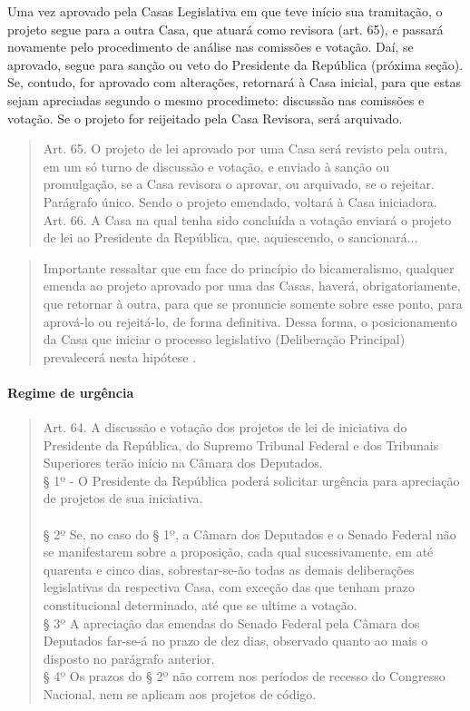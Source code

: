 \documentclass{article}
\begin{document}
Uma vez aprovado pela Casas Legislativa em que teve início sua tramitação, o projeto segue para a outra Casa, que atuará como revisora (art. 65), e passará novamente pelo procedimento de análise nas comissões e votação. Daí, se aprovado, segue para sanção ou veto do Presidente da República (próxima seção). Se, contudo, for aprovado com alterações, retornará à Casa inicial, para que estas sejam apreciadas segundo o mesmo procedimeto: discussão nas comissões e votação. Se o projeto for reijeitado pela Casa Revisora, será arquivado.

\begin{quote}
    Art. 65. O projeto de lei aprovado por uma Casa será revisto pela outra, em um só turno de discussão e votação, e enviado à sanção ou promulgação, se a Casa revisora o aprovar, ou arquivado, se o rejeitar.\\
    Parágrafo único. Sendo o projeto emendado, voltará à Casa iniciadora.\\
    Art. 66. A Casa na qual tenha sido concluída a votação enviará o projeto de lei ao Presidente da República, que, aquiescendo, o sancionará... \cite{brasil_constituicao_1988}
\end{quote}

\begin{quote}
    Importante ressaltar que em face do princípio do bicameralismo, qualquer emenda ao projeto aprovado por uma das Casas, haverá, obrigatoriamente, que retornar à outra, para que se pronuncie somente sobre esse ponto, para aprová-lo ou rejeitá-lo, de forma definitiva. Dessa forma, o posicionamento da Casa que iniciar o processo legislativo (Deliberação Principal) prevalecerá nesta hipótese \cite[p.~768]{moraes_direito_2023}.
\end{quote}

\paragraph{Regime de urgência}

\begin{quote}
    Art. 64. A discussão e votação dos projetos de lei de iniciativa do Presidente da República, do Supremo Tribunal Federal e dos Tribunais Superiores terão início na Câmara dos Deputados.\\
    § 1º - O Presidente da República poderá solicitar urgência para apreciação de projetos de sua iniciativa.\\\\
    § 2º Se, no caso do § 1º, a Câmara dos Deputados e o Senado Federal não se manifestarem sobre a proposição, cada qual sucessivamente, em até quarenta e cinco dias, sobrestar-se-ão todas as demais deliberações legislativas da respectiva Casa, com exceção das que tenham prazo constitucional determinado, até que se ultime a votação.\\
    § 3º A apreciação das emendas do Senado Federal pela Câmara dos Deputados far-se-á no prazo de dez dias, observado quanto ao mais o disposto no parágrafo anterior.\\
    § 4º Os prazos do § 2º não correm nos períodos de recesso do Congresso Nacional, nem se aplicam aos projetos de código. 
\end{quote}
\end{document}
